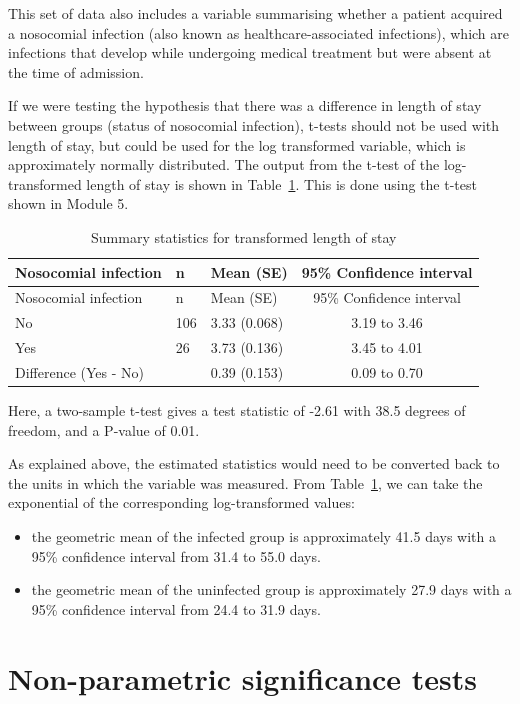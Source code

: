 \documentclass[
  a4paper,
]{memoir}
\providecommand{\tightlist}{%
  \setlength{\itemsep}{0pt}\setlength{\parskip}{0pt}}
\begin{document}
This set of data also includes a variable summarising whether a patient
acquired a nosocomial infection (also known as healthcare-associated
infections), which are infections that develop while undergoing medical
treatment but were absent at the time of admission.

If we were testing the hypothesis that there was a difference in length
of stay between groups (status of nosocomial infection), t-tests should
not be used with length of stay, but could be used for the log
transformed variable, which is approximately normally distributed. The
output from the t-test of the log-transformed length of stay is shown in
Table~\ref{tbl-los-ttest}. This is done using the t-test shown in Module
5.

\begin{longtable}[]{@{}lllc@{}}
\caption{Summary statistics for transformed length of
stay}\label{tbl-los-ttest}\tabularnewline
\toprule\noalign{}
Nosocomial infection & n & Mean (SE) & 95\% Confidence interval \\
\midrule\noalign{}
\endfirsthead
\toprule\noalign{}
Nosocomial infection & n & Mean (SE) & 95\% Confidence interval \\
\midrule\noalign{}
\endhead
\bottomrule\noalign{}
\endlastfoot
No & 106 & 3.33 (0.068) & 3.19 to 3.46 \\
Yes & 26 & 3.73 (0.136) & 3.45 to 4.01 \\
Difference (Yes - No) & & 0.39 (0.153) & 0.09 to 0.70 \\
\end{longtable}

Here, a two-sample t-test gives a test statistic of -2.61 with 38.5
degrees of freedom, and a P-value of 0.01.

As explained above, the estimated statistics would need to be converted
back to the units in which the variable was measured. From
Table~\ref{tbl-los-ttest}, we can take the exponential of the
corresponding log-transformed values:

\begin{itemize}
\tightlist
\item
  the geometric mean of the infected group is approximately 41.5 days
  with a 95\% confidence interval from 31.4 to 55.0 days.
\item
  the geometric mean of the uninfected group is approximately 27.9 days
  with a 95\% confidence interval from 24.4 to 31.9 days.
\end{itemize}

\section{Non-parametric significance
tests}\label{non-parametric-significance-tests}
\end{document}
